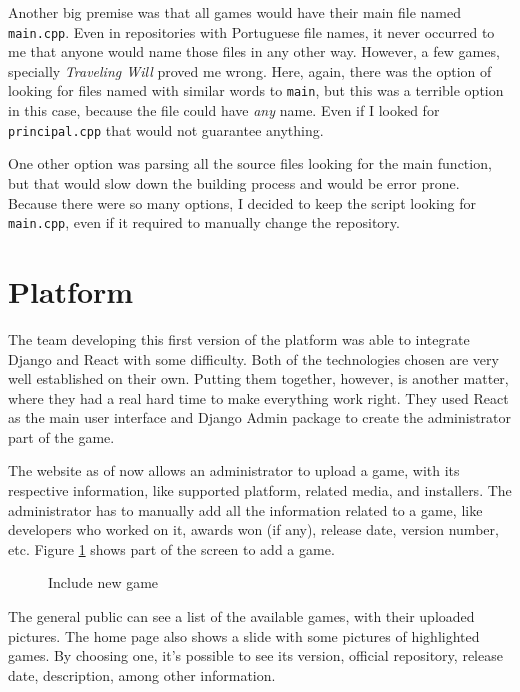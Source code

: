 Another big premise was that all games would have their main file named \texttt{main.cpp}. Even in repositories with Portuguese file names, it never occurred to me that anyone would name those files in any other way. However, a few games, specially \textit{Traveling Will} proved me wrong. Here, again, there was the option of looking for files named with similar words to \texttt{main}, but this was a terrible option in this case, because the file could have \textit{any} name. Even if I looked for \texttt{principal.cpp} that would not guarantee anything.

One other option was parsing all the source files looking for the main function, but that would slow down the building process and would be error prone. Because there were so many options, I decided to keep the script looking for \texttt{main.cpp}, even if it required to manually change the repository.


\section{Platform}
\label {sec:platform}

The team developing this first version of the platform was able to integrate Django and React with some difficulty. Both of the technologies chosen are very well established on their own. Putting them together, however, is another matter, where they had a real hard time to make everything work right. They used React as the main user interface and Django Admin package to create the administrator part of the game.

The website as of now allows an administrator to upload a game, with its respective information, like supported platform, related media, and installers.
The administrator has to manually add all the information related to a game, like developers who worked on it, awards won (if any), release date, version number, etc. Figure \ref{fig:include_game1} shows part of the screen to add a game.

\begin{figure}[h!]
\centering
{}
\caption{Include new game}
\label {fig:include_game1}
\end{figure}

The general public can see a list of the available games, with their uploaded pictures. The home page also shows a slide with some pictures of highlighted games. By choosing one, it's possible to see its version, official repository, release date, description, among other information.

